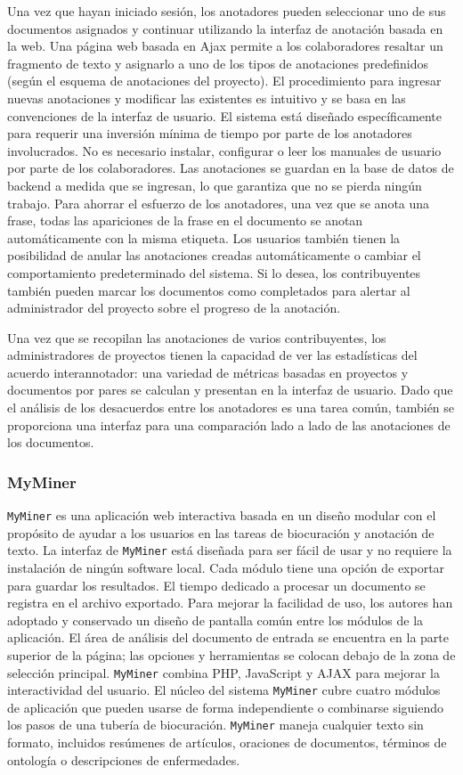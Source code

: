 Una vez que hayan iniciado sesión, los anotadores pueden seleccionar uno de sus documentos asignados y continuar utilizando la interfaz de anotación basada en la web.
Una página web basada en Ajax permite a los colaboradores resaltar un fragmento de texto y asignarlo a uno de los tipos de anotaciones predefinidos (según el esquema de anotaciones del proyecto).
El procedimiento para ingresar nuevas anotaciones y modificar las existentes es intuitivo y se basa en las convenciones de la interfaz de usuario.
El sistema está diseñado específicamente para requerir una inversión mínima de tiempo por parte de los anotadores involucrados.
No es necesario instalar, configurar o leer los manuales de usuario por parte de los colaboradores.
Las anotaciones se guardan en la base de datos de backend a medida que se ingresan, lo que garantiza que no se pierda ningún trabajo.
Para ahorrar el esfuerzo de los anotadores, una vez que se anota una frase, todas las apariciones de la frase en el documento se anotan automáticamente con la misma etiqueta.
Los usuarios también tienen la posibilidad de anular las anotaciones creadas automáticamente o cambiar el comportamiento predeterminado del sistema.
Si lo desea, los contribuyentes también pueden marcar los documentos como completados para alertar al administrador del proyecto sobre el progreso de la anotación.

Una vez que se recopilan las anotaciones de varios contribuyentes, los administradores de proyectos tienen la capacidad de ver las estadísticas del acuerdo interannotador: una variedad de métricas basadas en proyectos y documentos por pares se calculan y presentan en la interfaz de usuario.
Dado que el análisis de los desacuerdos entre los anotadores es una tarea común, también se proporciona una interfaz para una comparación lado a lado de las anotaciones de los documentos.

\subsubsection*{MyMiner}

\texttt{MyMiner} es una aplicación web interactiva basada en un diseño modular con el propósito de ayudar a los usuarios en las tareas de biocuración y anotación de texto.
La interfaz de \texttt{MyMiner} está diseñada para ser fácil de usar y no requiere la instalación de ningún software local.
Cada módulo tiene una opción de exportar para guardar los resultados.
El tiempo dedicado a procesar un documento se registra en el archivo exportado.
Para mejorar la facilidad de uso, los autores han adoptado y conservado un diseño de pantalla común entre los módulos de la aplicación.
El área de análisis del documento de entrada se encuentra en la parte superior de la página; las opciones y herramientas se colocan debajo de la zona de selección principal.
\texttt{MyMiner} combina PHP, JavaScript y AJAX para mejorar la interactividad del usuario. El núcleo del sistema \texttt{MyMiner} cubre cuatro módulos de aplicación que pueden usarse de forma independiente o combinarse siguiendo los pasos de una tubería de biocuración.
\texttt{MyMiner} maneja cualquier texto sin formato, incluidos resúmenes de artículos, oraciones de documentos, términos de ontología o descripciones de enfermedades.

